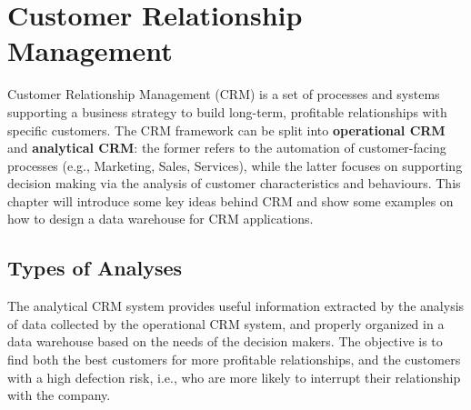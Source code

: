 \chapter{Customer Relationship Management}

Customer Relationship Management (CRM) is a set of processes and systems supporting a business strategy to build long-term, profitable relationships with specific customers. The CRM framework can be split into \textbf{operational CRM} and \textbf{analytical CRM}: the former refers to the automation of customer-facing processes (e.g., Marketing, Sales, Services), while the latter focuses on supporting decision making via the analysis of customer characteristics and behaviours. This chapter will introduce some key ideas behind CRM and show some examples on how to design a data warehouse for CRM applications.

\section{Types of Analyses}

The analytical CRM system provides useful information extracted by the analysis of data collected by the operational CRM system, and properly organized in a data warehouse based on the needs of the decision makers. The objective is to find both the best customers for more profitable relationships, and the customers with a high defection risk, i.e., who are more likely to interrupt their relationship with the company.

